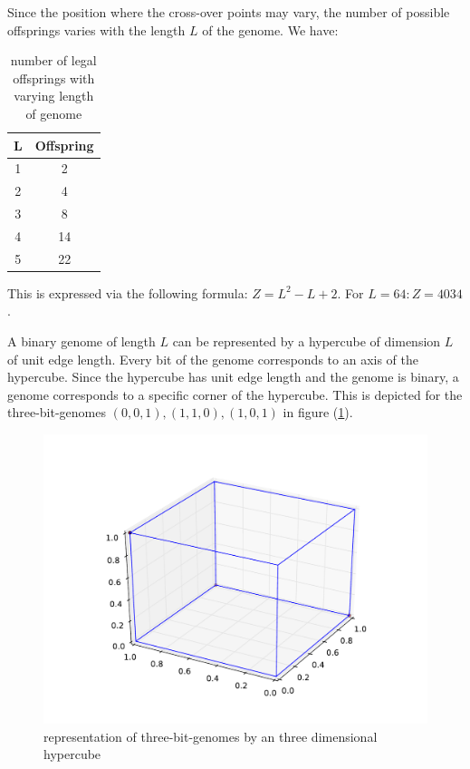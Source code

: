\documentclass[10pt,a4paper,boxed]{hmcpset}
\begin{document}
\begin{problem}[Assignment 44]
\end{problem}
\begin{solution}
Since the position where the cross-over points may vary, the number of possible offsprings varies with the length $L$ of the genome. We have:
\begin{table}[h!]
	\centering
	\begin{tabular}{c|c}
		   L & Offspring \\ 
	\hline 1 & 2 \\ 
	2 & 4 \\ 
	3 & 8 \\ 
	4 & 14 \\ 
	5 & 22 \\ 
	\end{tabular} 
\caption{number of legal offsprings with varying length of genome}
\end{table}

This is expressed via the following formula: $Z = L^2-L+2$.
For $L=64: Z = 4034$.
\end{solution}

\begin{problem}[Assignment 45]
\end{problem}
\begin{solution}
A binary genome of length $L$ can be represented by a hypercube of dimension $L$ of unit edge length. Every bit of the genome corresponds to an axis of the hypercube. Since the hypercube has unit edge length and the genome is binary, a genome corresponds to a specific corner of the hypercube. This is depicted for the three-bit-genomes $(0,0,1), (1,1,0), (1,0,1)$ in figure (\ref{fig:hypercube}).

\begin{figure}[h!]
	\includegraphics[width=\textwidth]{img/cube}
\caption{representation of three-bit-genomes by an three dimensional hypercube}
\label{fig:hypercube}
\end{figure}
\end{solution}
\end{document}
